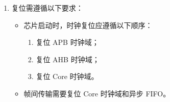 \documentclass[main\_\_CN.tex]{subfiles}
\begin{document}
\begin{enumerate}
    RX 模块中的具体操作步骤为：
    \begin{enumerate}
        \item 清除 \hyperref[fielddesc:PCRPARLCLKRXEN]{PCR\_PARL\_CLK\_RX\_EN} 关闭 RX Core 时钟域；
        \item 向 \hyperref[fielddesc:PARLIORXSTART]{PARL\_IO\_RX\_START} 写 1；
        \item 置位 \hyperref[fielddesc:PCRPARLCLKRXEN]{PCR\_PARL\_CLK\_RX\_EN} 打开 RX Core 时钟域；
        \item 操作外部设备，使其开始发送数据；
        \item 清除 \hyperref[fielddesc:PCRPARLCLKRXEN]{PCR\_PARL\_CLK\_RX\_EN} 关闭 RX Core 时钟域；
        \item 向 \hyperref[fielddesc:PARLIORXSTART]{PARL\_IO\_RX\_START} 写 0。
    \end{enumerate}
    TX 模块中的具体操作步骤为：
    \begin{enumerate}
        \item 清除 \hyperref[fielddesc:PCRPARLCLKTXEN]{PCR\_PARL\_CLK\_TX\_EN} 关闭 TX Core 时钟域；
        \item 向 \hyperref[fielddesc:PARLIOTXSTART]{PARL\_IO\_TX\_START} 写 1；
        \item 置位 \hyperref[fielddesc:PCRPARLCLKTXEN]{PCR\_PARL\_CLK\_TX\_EN} 打开 TX Core 时钟域；
        \item 操作外部设备，使其开始接收数据；
        \item 清除 \hyperref[fielddesc:PCRPARLCLKTXEN]{PCR\_PARL\_CLK\_TX\_EN} 关闭 TX Core 时钟域；
        \item 向 \hyperref[fielddesc:PARLIOTXSTART]{PARL\_IO\_TX\_START} 写 0。
    \end{enumerate}
    
    \item 复位需遵循以下要求：
    \begin{itemize}
        \item 芯片启动时，时钟复位应遵循以下顺序：
        \begin{enumerate}
            \item 复位 APB 时钟域；
            \item 复位 AHB 时钟域；
            \item 复位 Core 时钟域。
        \end{enumerate}
        \item 帧间传输需要复位 Core 时钟域和异步 FIFO。
    \end{itemize}
\end{enumerate}
\end{document}
